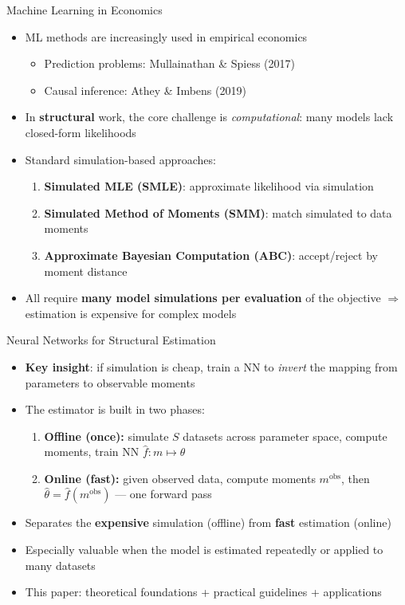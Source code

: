 \documentclass[aspectratio=169,professionalfonts]{beamer}
\newcommand{\hl}[1]{\textbf{\textcolor{UGARed}{#1}}}
\begin{document}
\begin{frame}{Machine Learning in Economics}
  \begin{itemize}
    \item ML methods are increasingly used in empirical economics
      \begin{itemize}
        \item Prediction problems: Mullainathan \& Spiess (2017)
        \item Causal inference: Athey \& Imbens (2019)
      \end{itemize}
    \item In \hl{structural} work, the core challenge is \textit{computational}:
          many models lack closed-form likelihoods
    \item Standard simulation-based approaches:
      \begin{enumerate}
        \item \textbf{Simulated MLE (SMLE)}: approximate likelihood via simulation
        \item \textbf{Simulated Method of Moments (SMM)}: match simulated to data moments
        \item \textbf{Approximate Bayesian Computation (ABC)}: accept/reject by moment distance
      \end{enumerate}
    \item All require \hl{many model simulations per evaluation} of the objective
          $\Rightarrow$ estimation is expensive for complex models
  \end{itemize}
\end{frame}

\begin{frame}{Neural Networks for Structural Estimation}
  \begin{itemize}
    \item \hl{Key insight}: if simulation is cheap, train a NN to \emph{invert}
          the mapping from parameters to observable moments
    \item The estimator is built in two phases:
      \begin{enumerate}
        \item \textbf{Offline (once):} simulate $S$ datasets across parameter space,
              compute moments, train NN $\hat{f}: m \mapsto \theta$
        \item \textbf{Online (fast):} given observed data, compute moments $m^{\text{obs}}$,
              then $\hat\theta = \hat{f}(m^{\text{obs}})$ --- one forward pass
      \end{enumerate}
    \item Separates the \hl{expensive} simulation (offline) from \hl{fast} estimation (online)
    \item Especially valuable when the model is estimated repeatedly or applied to many datasets
    \item This paper: theoretical foundations + practical guidelines + applications
  \end{itemize}
\end{frame}
\end{document}
